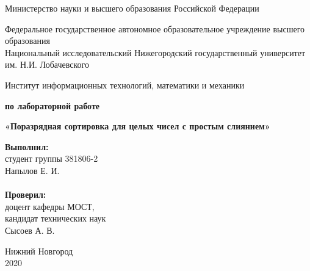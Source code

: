\documentclass{report}
\begin{document}
	\begin{titlepage}

		\begin{center}
			Министерство науки и высшего образования Российской Федерации
		\end{center}

		\begin{center}
			Федеральное государственное автономное образовательное учреждение высшего образования \\
			Национальный исследовательский Нижегородский государственный университет им. Н.И. Лобачевского
		\end{center}

		\begin{center}
			Институт информационных технологий, математики и механики
		\end{center}

		\vspace{4em}

		\begin{center}
			\textbf{ по лабораторной работе} \\
		\end{center}
		\begin{center}
			\textbf{\Large«Поразрядная сортировка для целых чисел с простым слиянием»} \\
		\end{center}

		\vspace{4em}

		\newbox{\lbox}
		\newlength{\maxl}
		\setlength{\maxl}{\wd\lbox}
		\hfill\parbox{7cm}{
			\hspace*{5cm}\hspace*{-5cm}\textbf{Выполнил:} \\ студент группы 381806-2 \\ Напылов Е. И.\\
			\\
			\hspace*{5cm}\hspace*{-5cm}\textbf{Проверил:}\\ доцент кафедры МОСТ, \\ кандидат технических наук \\ Сысоев А. В.\\
		}
		\vspace{\fill}

		\begin{center} Нижний Новгород \\ 2020 \end{center}

	\end{titlepage}
\end{document}
